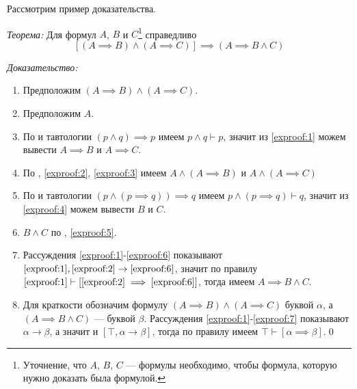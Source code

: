
Рассмотрим пример доказательства.

{\it Теорема:} Для формул $A$, $B$ и $C$\footnote{
	Уточнение, что $A$, $B$, $C$ --- формулы необходимо, чтобы формула, которую
	нужно доказать была формулой.
} справедливо
\[
	[(A\implies B)\land (A\implies C)]\implies (A\implies B\land C)
\]

{\it Доказательство:}
\begin{enumerate}[label=(\arabic*)]
	\item{}Предположим $(A\implies B)\land (A\implies C)$.\label{exproof:1}

	\item{}Предположим $A$.\label{exproof:2}

	\item{}По \taut{} и тавтологии $(p\land q)\implies p$ имеем
	$p\land q\vdash p$, значит из \ref{exproof:1} можем вывести
	$A\implies B$ и $A\implies C$.\label{exproof:3}

	\item{}По \conj{}, \ref{exproof:2}, \ref{exproof:3}
	имеем $A\land (A\implies B)$ и $A\land (A\implies C)$
	\label{exproof:4}

	\item{}По \taut{} и тавтологии $(p\land (p\implies q))\implies q$
	имеем $p\land (p\implies q)\vdash q$, значит из \ref{exproof:4} можем вывести $B$
	и $C$.\label{exproof:5}

	\item{}$B\land C$ по \conj{}, \ref{exproof:5}.\label{exproof:6}

	\item{}Рассуждения \ref{exproof:1}-\ref{exproof:6} показывают
	$\ref{exproof:1},\ref{exproof:2}\to \ref{exproof:6}$, значит по правилу
	\implic{} $\ref{exproof:1}\vdash [\ref{exproof:2}\implies \ref{exproof:6}]$,
	тогда имеем $A\implies B\land C$.\label{exproof:7}

	\item{}Для краткости обозначим формулу
	$(A\implies B)\land (A\implies C)$ буквой $\alpha$,
	а $(A\implies B\land C)$ --- буквой $\beta$.
	Рассуждения \ref{exproof:1}-\ref{exproof:7} показывают $\alpha\to\beta$,
	а значит и $[\top,\alpha\to\beta]$, тогда по правилу \implic{}
	имеем $\top\vdash [\alpha\implies\beta]$.\qed
\end{enumerate}

